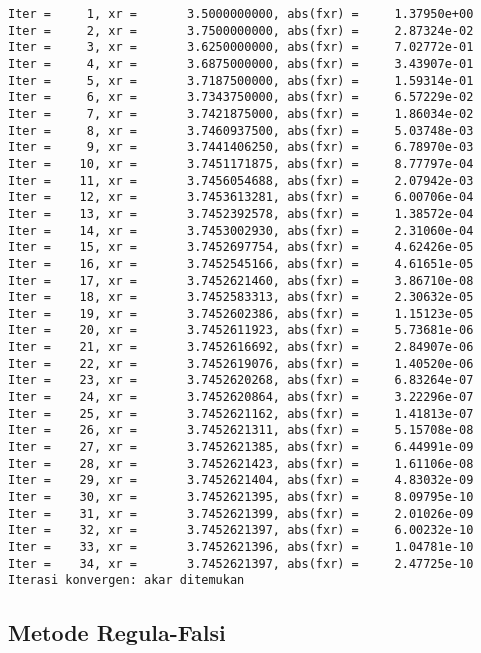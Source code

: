 \documentclass[11pt]{article}
\begin{document}
    \begin{Verbatim}[commandchars=\\\{\}]
Iter =     1, xr =       3.5000000000, abs(fxr) =     1.37950e+00
Iter =     2, xr =       3.7500000000, abs(fxr) =     2.87324e-02
Iter =     3, xr =       3.6250000000, abs(fxr) =     7.02772e-01
Iter =     4, xr =       3.6875000000, abs(fxr) =     3.43907e-01
Iter =     5, xr =       3.7187500000, abs(fxr) =     1.59314e-01
Iter =     6, xr =       3.7343750000, abs(fxr) =     6.57229e-02
Iter =     7, xr =       3.7421875000, abs(fxr) =     1.86034e-02
Iter =     8, xr =       3.7460937500, abs(fxr) =     5.03748e-03
Iter =     9, xr =       3.7441406250, abs(fxr) =     6.78970e-03
Iter =    10, xr =       3.7451171875, abs(fxr) =     8.77797e-04
Iter =    11, xr =       3.7456054688, abs(fxr) =     2.07942e-03
Iter =    12, xr =       3.7453613281, abs(fxr) =     6.00706e-04
Iter =    13, xr =       3.7452392578, abs(fxr) =     1.38572e-04
Iter =    14, xr =       3.7453002930, abs(fxr) =     2.31060e-04
Iter =    15, xr =       3.7452697754, abs(fxr) =     4.62426e-05
Iter =    16, xr =       3.7452545166, abs(fxr) =     4.61651e-05
Iter =    17, xr =       3.7452621460, abs(fxr) =     3.86710e-08
Iter =    18, xr =       3.7452583313, abs(fxr) =     2.30632e-05
Iter =    19, xr =       3.7452602386, abs(fxr) =     1.15123e-05
Iter =    20, xr =       3.7452611923, abs(fxr) =     5.73681e-06
Iter =    21, xr =       3.7452616692, abs(fxr) =     2.84907e-06
Iter =    22, xr =       3.7452619076, abs(fxr) =     1.40520e-06
Iter =    23, xr =       3.7452620268, abs(fxr) =     6.83264e-07
Iter =    24, xr =       3.7452620864, abs(fxr) =     3.22296e-07
Iter =    25, xr =       3.7452621162, abs(fxr) =     1.41813e-07
Iter =    26, xr =       3.7452621311, abs(fxr) =     5.15708e-08
Iter =    27, xr =       3.7452621385, abs(fxr) =     6.44991e-09
Iter =    28, xr =       3.7452621423, abs(fxr) =     1.61106e-08
Iter =    29, xr =       3.7452621404, abs(fxr) =     4.83032e-09
Iter =    30, xr =       3.7452621395, abs(fxr) =     8.09795e-10
Iter =    31, xr =       3.7452621399, abs(fxr) =     2.01026e-09
Iter =    32, xr =       3.7452621397, abs(fxr) =     6.00232e-10
Iter =    33, xr =       3.7452621396, abs(fxr) =     1.04781e-10
Iter =    34, xr =       3.7452621397, abs(fxr) =     2.47725e-10
Iterasi konvergen: akar ditemukan

    \end{Verbatim}

    \hypertarget{metode-regula-falsi}{%
\subsection{Metode Regula-Falsi}\label{metode-regula-falsi}}
\end{document}
